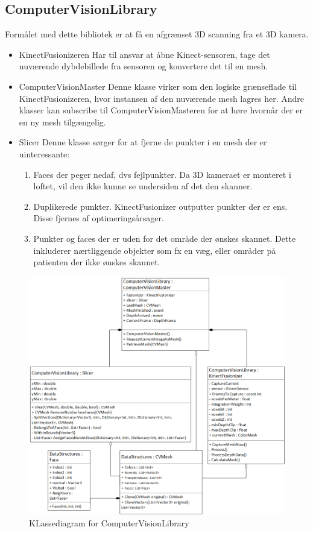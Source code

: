 \subsection{ComputerVisionLibrary}
Formålet med dette bibliotek er at få en afgrænset 3D scanning fra et 3D kamera.

\begin{itemize}
\item{KinectFusionizeren}
Har til ansvar at åbne Kinect-sensoren, tage det nuværende dybdebillede fra sensoren og konvertere det til en mesh.

\item{ComputerVisionMaster}
Denne klasse virker som den logiske grænseflade til KinectFusionizeren, hvor instansen af den nuværende mesh lagres her.
Andre klasser kan subscribe til ComputerVisionMasteren for at høre hvornår der er en ny mesh tilgængelig.

\item{Slicer}
Denne klasse sørger for at fjerne de punkter i en mesh der er uinteressante:
\begin{enumerate}
\item{Faces der peger nedaf, dvs fejlpunkter. Da 3D kameraet er monteret i loftet, vil den ikke kunne se undersiden af det den skanner.}
\item{Duplikerede punkter. KinectFusionizer outputter punkter der er ens. Disse fjernes af optimeringsårsager.}
\item{Punkter og faces der er uden for det område der ønskes skannet. Dette inkluderer nærtliggende objekter som fx en væg, eller områder på patienten der ikke ønskes skannet.}
\end{enumerate}
\end{itemize}

\begin{figure}[H]
    \centering
    \includegraphics[width=1\textwidth]{figurer/d/Design/Class/uml_class_computervisionlibrary}
    \caption{KLassediagram for ComputerVisionLibrary}
    \label{class_ComputerVisionLib}
\end{figure}
\newpage

